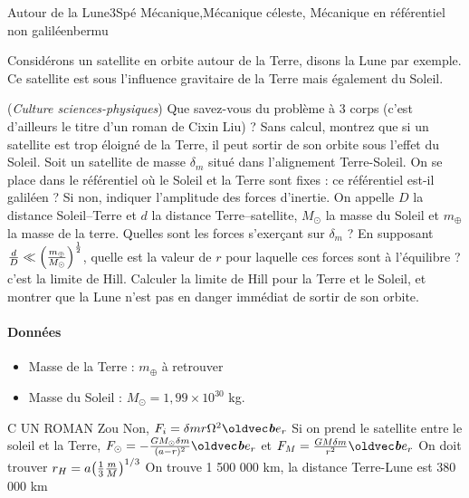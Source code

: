 
\begin{exercise}{Autour de la Lune}{3}{Spé}
{Mécanique,Mécanique céleste, Mécanique en référentiel non galiléen}{bermu}

Considérons un satellite en orbite autour de la Terre, disons la Lune par exemple. Ce satellite est sous l'influence gravitaire de la Terre mais également du Soleil.

\begin{questions}
        \question (\emph{Culture sciences-physiques}) Que savez-vous du problème à 3 corps (c'est d'ailleurs le titre d'un roman de Cixin Liu) ?
        \question Sans calcul, montrez que si un satellite est trop éloigné de la Terre, il peut sortir de son orbite sous l'effet du Soleil.
        \question Soit un satellite de masse $\delta_m$ situé dans l'alignement Terre-Soleil. On se place dans le référentiel où le Soleil et la Terre sont fixes : ce référentiel est-il galiléen ? Si non, indiquer l'amplitude des forces d'inertie.
        \question On appelle $D$ la distance Soleil--Terre et $d$ la distance Terre--satellite, $M_\odot$ la masse du Soleil et $m_\oplus$ la masse de la terre. Quelles sont les forces s'exerçant sur $\delta_m$ ? 
        \question En supposant $\frac{d}{D} \ll \qty(\frac{m_\oplus}{M_\odot})^{\frac12}$, quelle est la valeur de $r$ pour laquelle ces forces sont à l'équilibre ? c'est la limite de Hill.
        \question Calculer la limite de Hill pour la Terre et le Soleil, et montrer que la Lune n'est pas en danger immédiat de sortir de son orbite.
\end{questions}

\paragraph{Données}
\begin{itemize}
    \item Masse de la Terre : $m_\oplus$ à retrouver
    \item Masse du Soleil : $M_\odot = 1,99\times 10^{30}$ kg.
\end{itemize}

\end{exercise}

\begin{solution}
\begin{questions}
    \question C UN ROMAN
    \question Zou
    \question Non, $F_i = \delta m r\Omega^2 \vb{e_r}$
    \question Si on prend le satellite entre le soleil et la Terre, $F_{\odot} = -\frac{GM_{\odot}\delta m}{(a-r)^2}\vb{e_r}$ et $F_{M} = \frac{GM\delta m}{r^2}\vb{e_r}$
    \question On doit trouver $r_H = a\qty(\frac13\frac{m}{M})^{1/3}$
    \question On trouve 1 500 000 km, la distance Terre-Lune est 380 000 km
\end{questions}
\end{solution}